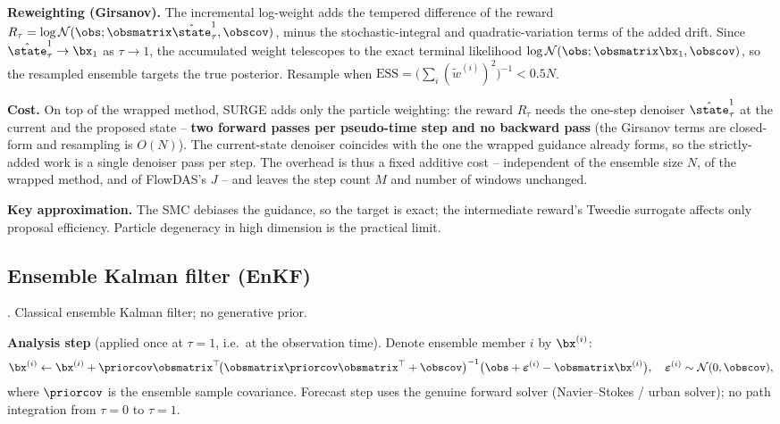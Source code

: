 \textbf{Reweighting (Girsanov).}
The incremental log-weight adds the tempered difference of the reward $R_\tau=\log\mathcal{N}(\obs;\obsmatrix\hat{\state}^1_\tau,\obscov)$, minus the stochastic-integral and quadratic-variation terms of the added drift.
Since $\hat{\state}^1_\tau\to\bx_1$ as $\tau\to1$, the accumulated weight telescopes to the exact terminal likelihood $\log\mathcal{N}(\obs;\obsmatrix\bx_1,\obscov)$, so the resampled ensemble targets the true posterior.
Resample when $\mathrm{ESS} = \bigl(\sum_i (\tilde{w}^{(i)})^{2}\bigr)^{-1} < 0.5N$.

\textbf{Cost.}
On top of the wrapped method, SURGE adds only the particle weighting: the reward $R_\tau$ needs the one-step denoiser $\hat{\state}^1_\tau$ at the current and the proposed state -- \textbf{two forward passes per pseudo-time step and no backward pass} (the Girsanov terms are closed-form and resampling is $O(N)$). The current-state denoiser coincides with the one the wrapped guidance already forms, so the strictly-added work is a single denoiser pass per step. The overhead is thus a fixed additive cost -- independent of the ensemble size $N$, of the wrapped method, and of FlowDAS's $J$ -- and leaves the step count $M$ and number of windows unchanged.

\textbf{Key approximation.}
The SMC debiases the guidance, so the target is exact; the intermediate reward's Tweedie surrogate affects only proposal efficiency. Particle degeneracy in high dimension is the practical limit.

\subsection{Ensemble Kalman filter (EnKF)}\label{appendix:method:enkf}

\cite{evensen_data_2022}. Classical ensemble Kalman filter; no generative prior.

\textbf{Analysis step} (applied once at $\tau=1$, i.e.\ at the observation time).
Denote ensemble member $i$ by $\bx^{(i)}$:
\begin{align}
  \bx^{(i)} \leftarrow \bx^{(i)}
  + \priorcov\obsmatrix^\top\!\bigl(\obsmatrix\priorcov\obsmatrix^\top+\obscov\bigr)^{-1}
    \bigl(\obs + \boldsymbol\varepsilon^{(i)} - \obsmatrix\bx^{(i)}\bigr),
  \quad \boldsymbol\varepsilon^{(i)}\sim\mathcal{N}(0,\obscov),
\end{align}
where $\priorcov$ is the ensemble sample covariance. Forecast step uses the genuine forward solver (Navier--Stokes / urban solver); no path integration from $\tau=0$ to $\tau=1$.


